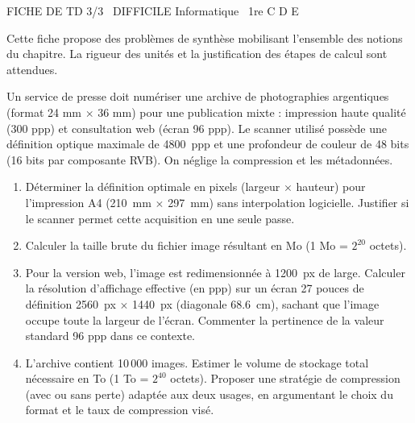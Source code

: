\documentclass[11pt]{article}
\begin{document}
\begin{tcolorbox}[enhanced,colback=popink,colframe=popink,arc=10pt,boxrule=0pt,left=12pt,right=12pt,top=9pt,bottom=9pt]
{\color{white}\popxbold\small FICHE DE TD 3/3 \textbullet\ DIFFICILE \hfill Informatique \textbullet\ 1re C D E\par}
\end{tcolorbox}
\vspace{4pt}
Cette fiche propose des problèmes de synthèse mobilisant l'ensemble des notions du chapitre. La rigueur des unités et la justification des étapes de calcul sont attendues.

\begin{exercice}
Un service de presse doit numériser une archive de photographies argentiques (format 24 mm $\times$ 36 mm) pour une publication mixte : impression haute qualité (300 ppp) et consultation web (écran 96 ppp). Le scanner utilisé possède une définition optique maximale de \SI{4800}{ppp} et une profondeur de couleur de 48 bits (16 bits par composante RVB). On néglige la compression et les métadonnées.

\begin{enumerate}
    \item Déterminer la définition optimale en pixels (largeur $\times$ hauteur) pour l'impression A4 (\SI{210}{mm} $\times$ \SI{297}{mm}) sans interpolation logicielle. Justifier si le scanner permet cette acquisition en une seule passe.
    \item Calculer la taille brute du fichier image résultant en Mo (1 Mo = $2^{20}$ octets).
    \item Pour la version web, l'image est redimensionnée à \SI{1200}{px} de large. Calculer la résolution d'affichage effective (en ppp) sur un écran 27 pouces de définition \SI{2560}{px} $\times$ \SI{1440}{px} (diagonale \SI{68,6}{cm}), sachant que l'image occupe toute la largeur de l'écran. Commenter la pertinence de la valeur standard 96 ppp dans ce contexte.
    \item L'archive contient 10\,000 images. Estimer le volume de stockage total nécessaire en To (1 To = $2^{40}$ octets). Proposer une stratégie de compression (avec ou sans perte) adaptée aux deux usages, en argumentant le choix du format et le taux de compression visé.
\end{enumerate}
\end{exercice}
\end{document}
